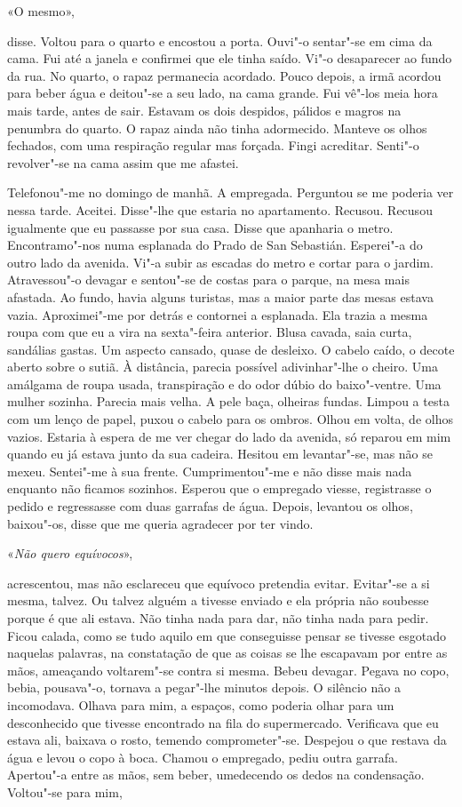 «O mesmo»,

disse. Voltou para o quarto e encostou a porta. Ouvi"-o sentar"-se em
cima da cama. Fui até a janela e confirmei que ele tinha saído. Vi"-o
desaparecer ao fundo da rua. No quarto, o rapaz permanecia acordado.
Pouco depois, a irmã acordou para beber água e deitou"-se a seu lado, na
cama grande. Fui vê"-los meia hora mais tarde, antes de sair. Estavam os
dois despidos, pálidos e magros na penumbra do quarto. O rapaz ainda não
tinha adormecido. Manteve os olhos fechados, com uma respiração regular
mas forçada. Fingi acreditar. Senti"-o revolver"-se na cama assim que me
afastei.

Telefonou"-me no domingo de manhã. A empregada. Perguntou se me poderia
ver nessa tarde. Aceitei. Disse"-lhe que estaria no apartamento.
Recusou. Recusou igualmente que eu passasse por sua casa. Disse que
apanharia o metro. Encontramo"-nos numa esplanada do Prado de San
Sebastián. Esperei"-a do outro lado da avenida. Vi"-a subir as escadas
do metro e cortar para o jardim. Atravessou"-o devagar e sentou"-se de
costas para o parque, na mesa mais afastada. Ao fundo, havia alguns
turistas, mas a maior parte das mesas estava vazia. Aproximei"-me por
detrás e contornei a esplanada. Ela trazia a mesma roupa com que eu a
vira na sexta"-feira anterior. Blusa cavada, saia curta, sandálias
gastas. Um aspecto cansado, quase de desleixo. O cabelo caído, o decote
aberto sobre o sutiã. À distância, parecia possível adivinhar"-lhe o
cheiro. Uma amálgama de roupa usada, transpiração e do odor dúbio do
baixo"-ventre. Uma mulher sozinha. Parecia mais velha. A pele baça,
olheiras fundas. Limpou a testa com um lenço de papel, puxou o cabelo
para os ombros. Olhou em volta, de olhos vazios. Estaria à espera de me
ver chegar do lado da avenida, só reparou em mim quando eu já estava
junto da sua cadeira. Hesitou em levantar"-se, mas não se mexeu.
Sentei"-me à sua frente. Cumprimentou"-me e não disse mais nada enquanto
não ficamos sozinhos. Esperou que o empregado viesse, registrasse o
pedido e regressasse com duas garrafas de água. Depois, levantou os
olhos, baixou"-os, disse que me queria agradecer por ter vindo.

«\emph{Não quero equívocos}»,

acrescentou, mas não esclareceu que equívoco pretendia evitar.
Evitar"-se a si mesma, talvez. Ou talvez alguém a tivesse enviado e ela
própria não soubesse porque é que ali estava. Não tinha nada para dar,
não tinha nada para pedir. Ficou calada, como se tudo aquilo em que
conseguisse pensar se tivesse esgotado naquelas palavras, na constatação
de que as coisas se lhe escapavam por entre as mãos, ameaçando
voltarem"-se contra si mesma. Bebeu devagar. Pegava no copo, bebia,
pousava"-o, tornava a pegar"-lhe minutos depois. O silêncio não a
incomodava. Olhava para mim, a espaços, como poderia olhar para um
desconhecido que tivesse encontrado na fila do supermercado. Verificava
que eu estava ali, baixava o rosto, temendo comprometer"-se. Despejou o
que restava da água e levou o copo à boca. Chamou o empregado, pediu
outra garrafa. Apertou"-a entre as mãos, sem beber, umedecendo os dedos
na condensação. Voltou"-se para mim,

